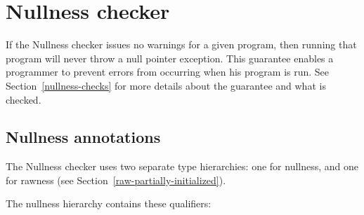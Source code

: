 \htmlhr
\chapter{Nullness checker\label{nullness-checker}}

If the Nullness checker issues no warnings for a given program, then
running that program will never throw a null pointer exception.  This
guarantee enables a programmer to prevent errors from occurring when his
program is run.  See Section~\ref{nullness-checks} for more details about
the guarantee and what is checked.


\section{Nullness annotations\label{nullness-annotations}}

The Nullness checker uses two separate type hierarchies:  one for nullness,
and one for rawness (see Section~\ref{raw-partially-initialized}).

The nullness hierarchy contains these qualifiers:

